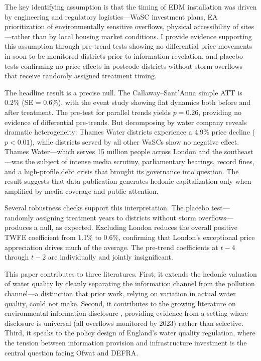 \documentclass[12pt]{article}
\begin{document}
The key identifying assumption is that the timing of EDM installation was driven by engineering and regulatory logistics---WaSC investment plans, EA prioritization of environmentally sensitive overflows, physical accessibility of sites---rather than by local housing market conditions. I provide evidence supporting this assumption through pre-trend tests showing no differential price movements in soon-to-be-monitored districts prior to information revelation, and placebo tests confirming no price effects in postcode districts without storm overflows that receive randomly assigned treatment timing.

The headline result is a precise null. The Callaway--Sant'Anna simple ATT is 0.2\% (SE = 0.6\%), with the event study showing flat dynamics both before and after treatment. The pre-test for parallel trends yields $p = 0.26$, providing no evidence of differential pre-trends. But decomposing by water company reveals dramatic heterogeneity: Thames Water districts experience a 4.9\% price decline ($p < 0.01$), while districts served by all other WaSCs show no negative effect. Thames Water---which serves 15 million people across London and the southeast---was the subject of intense media scrutiny, parliamentary hearings, record fines, and a high-profile debt crisis that brought its governance into question. The result suggests that data publication generates hedonic capitalization only when amplified by media coverage and public attention.

Several robustness checks support this interpretation. The placebo test---randomly assigning treatment years to districts without storm overflows---produces a null, as expected. Excluding London reduces the overall positive TWFE coefficient from 1.1\% to 0.6\%, confirming that London's exceptional price appreciation drives much of the average. The pre-trend coefficients at $t-4$ through $t-2$ are individually and jointly insignificant.

This paper contributes to three literatures. First, it extends the hedonic valuation of water quality \citep{keiser2019, levin2002, walsh2011} by cleanly separating the information channel from the pollution channel---a distinction that prior work, relying on variation in actual water quality, could not make. Second, it contributes to the growing literature on environmental information disclosure \citep{greenstone2006, mastromonaco2015, banzhaf2019}, providing evidence from a setting where disclosure is universal (all overflows monitored by 2023) rather than selective. Third, it speaks to the policy design of England's water quality regulation, where the tension between information provision and infrastructure investment is the central question facing Ofwat and DEFRA.
\end{document}
